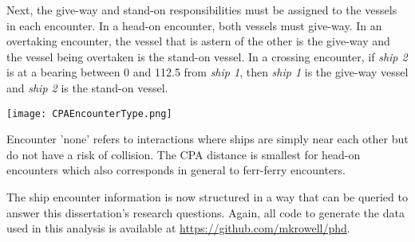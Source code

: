 \documentclass[twoside,symmetric,notoc]{tufte-book}
\begin{document}
\par{%
Next, the give-way and stand-on responsibilities must be assigned to the vessels in each encounter. In a head-on encounter, both vessels must give-way. In an overtaking encounter, the vessel that is astern of the other is the give-way and the vessel being overtaken is the stand-on vessel. In a crossing encounter, if \textit{ship 2} is at a bearing between 0 and 112.5 from \textit{ship 1}, then \textit{ship 1} is the give-way vessel and \textit{ship 2} is the stand-on vessel. 
}
\par{%
\begin{marginfigure}
    \texttt{[image: CPAEncounterType.png]}
    \label{fig:cpaencounter}
    \caption{Encounter 'none' refers to interactions where ships are simply near each other but do not have a risk of collision. The CPA distance is smallest for head-on encounters which also corresponds in general to ferr-ferry encounters.}
\end{marginfigure}
The ship encounter information is now structured in a way that can be queried to answer this dissertation's research questions. Again, all code to generate the data used in this analysis is available at \url{https://github.com/mkrowell/phd}.
}
\end{document}
